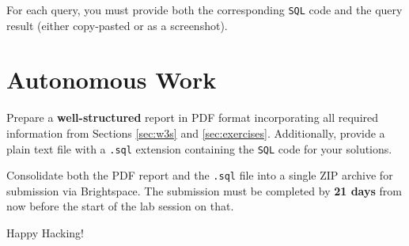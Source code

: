 \documentclass{article}
\begin{document}
For each query, you must provide both the corresponding \texttt{SQL} code and the query result (either copy-pasted or as a screenshot).

\section{Autonomous Work}

Prepare a \textbf{well-structured} report in PDF format incorporating all required information from Sections \ref{sec:w3s} and \ref{sec:exercises}. Additionally, provide a plain text file with a \texttt{.sql} extension containing the \texttt{SQL} code for your solutions.

Consolidate both the PDF report and the \texttt{.sql} file into a single ZIP archive for submission via Brightspace\texttrademark. The submission must be completed by \textbf{21 days} from now before the start of the lab session on that.

\vspace{5mm}
Happy Hacking! 
\end{document}
